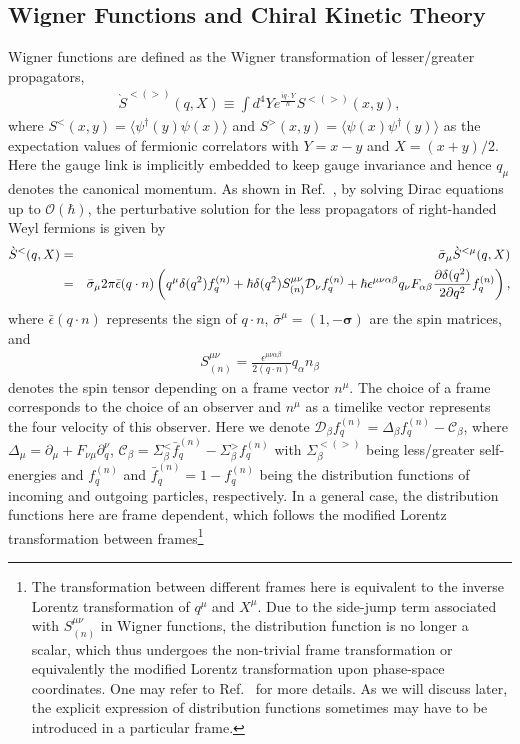 \documentclass[aps,prd,showkeys,preprint,amsmath,amssymb,nofootinbib]{revtex4-1}
\begin{document}
\subsection{Wigner Functions and Chiral Kinetic Theory}\label{Wigner}
Wigner functions are defined as the Wigner transformation of lesser/greater propagators,
\begin{eqnarray}
\grave{S}^{<(>)}(q,X)\equiv\int d^4Ye^{\frac{iq\cdot Y}{\hbar}}S^{<(>)}(x,y),
\end{eqnarray}
where $S^<(x,y)=\langle\psi^{\dagger}(y)\psi(x)\rangle$ and $S^>(x,y)=\langle\psi(x)\psi^{\dagger}(y)\rangle$ as the expectation values of fermionic correlators with $Y=x-y$ and $X=(x+y)/2$. Here the gauge link is implicitly embedded to keep gauge invariance and hence $q_{\mu}$ denotes the canonical momentum.
As shown in Ref.~\cite{Hidaka:2016yjf}, by solving Dirac equations up to $\mathcal{O}(\hbar)$, the perturbative solution for the less propagators of right-handed Weyl fermions is given by   
\begin{eqnarray}\label{Wigner_S}
	\grave{S}^{<}(q,X)&=& \bar{\sigma}_{\mu}\grave{S}^{<\mu}(q,X)\notag\\
	&=&\bar{\sigma}_{\mu} 2\pi\bar{\epsilon}(q\cdot n)\left(q^{\mu}\delta(q^2)f^{(n)}_q+\hbar\delta(q^2)S_{(n)}^{\mu\nu}\mathcal{D}_{\nu}f^{(n)}_q
	+\hbar\epsilon^{\mu\nu\alpha\beta}q_{\nu}F_{\alpha\beta}\frac{\partial\delta(q^2)}{2\partial q^2}f^{(n)}_q
	\right),
\end{eqnarray}
where $\bar{\epsilon}(q\cdot n)$ represents the sign of $q\cdot n$, $\bar{\sigma}^{\mu}=(1,-\bm{\sigma})$ are the spin matrices,
and
\begin{eqnarray}
S^{\mu\nu}_{(n)}=\frac{\epsilon^{\mu\nu\alpha\beta}}{2(q\cdot n)}q_{\alpha}n_{\beta} 
\label{S_n_1}
\end{eqnarray}
denotes the spin tensor depending on a frame vector $n^{\mu}$. The choice of a frame corresponds to the choice of an observer and $n^{\mu}$ as a timelike vector represents the four velocity of this observer.
Here we denote $\mathcal{D}_{\beta}f^{(n)}_q=\Delta_{\beta}f^{(n)}_q-\mathcal{C}_{\beta}$, where $\Delta_{\mu}=\partial_{\mu}+F_{\nu\mu}\partial^{\nu}_q$,  $\mathcal{C}_{\beta}=\Sigma_{\beta}^<\bar{f}^{(n)}_q-\Sigma_{\beta}^>f^{(n)}_q$ with $\Sigma_{\beta}^{<(>)}$ being less/greater self-energies and $f^{(n)}_q$ and $\bar{f}^{(n)}_q=1-f^{(n)}_q$ being the distribution functions of incoming and outgoing particles, respectively. In a general case, the distribution functions here are frame dependent, which follows the modified Lorentz transformation between frames\textcolor{blue}{\footnote{The transformation between different frames here is equivalent to the inverse Lorentz transformation of $q^{\mu}$ and $X^{\mu}$. Due to the side-jump term associated with $S_{(n)}^{\mu\nu}$ in Wigner functions, the distribution function is no longer a scalar, which thus undergoes the non-trivial frame transformation or equivalently the modified Lorentz transformation upon phase-space coordinates. One may refer to Ref.~\cite{Hidaka:2016yjf} for more details. As we will discuss later, the explicit expression of distribution functions sometimes may have to be introduced in a particular frame.}}
\end{document}
